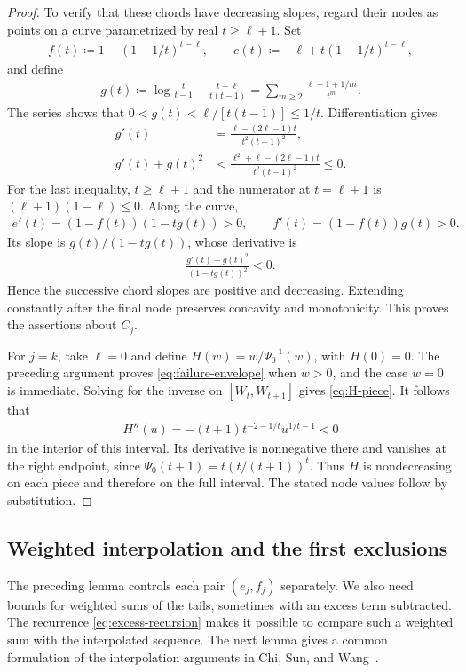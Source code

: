 \begin{proof}
To verify that these chords have decreasing slopes, regard their nodes as points on a curve parametrized by real $t\ge\ell+1$. Set
\begin{align*}
 f(t)\coloneqq1-(1-1/t)^{t-\ell},
 \qquad e(t)\coloneqq-\ell+t(1-1/t)^{t-\ell},
\end{align*}
and define
\begin{align*}
 g(t)\coloneqq\log\frac{t}{t-1}-\frac{t-\ell}{t(t-1)}
 =\sum_{m\ge2}\frac{\ell-1+1/m}{t^m}.
\end{align*}
The series shows that $0<g(t)<\ell/[t(t-1)]\le1/t$. Differentiation gives
\begin{align*}
 g'(t)&=\frac{\ell-(2\ell-1)t}{t^2(t-1)^2},\\
 g'(t)+g(t)^2
 &<\frac{\ell^2+\ell-(2\ell-1)t}{t^2(t-1)^2}\le0.
\end{align*}
For the last inequality, $t\ge\ell+1$ and the numerator at $t=\ell+1$ is $(\ell+1)(1-\ell)\le0$. Along the curve,
\begin{align*}
 e'(t)=(1-f(t))(1-tg(t))>0,
 \qquad f'(t)=(1-f(t))g(t)>0.
\end{align*}
Its slope is $g(t)/(1-tg(t))$, whose derivative is
\begin{align*}
 \frac{g'(t)+g(t)^2}{(1-tg(t))^2}<0.
\end{align*}
Hence the successive chord slopes are positive and decreasing. Extending constantly after the final node preserves concavity and monotonicity. This proves the assertions about $C_j$.

For $j=k$, take $\ell=0$ and define $H(w)=w/\Psi_0^{-1}(w)$, with $H(0)=0$. The preceding argument proves \cref{eq:failure-envelope} when $w>0$, and the case $w=0$ is immediate. Solving for the inverse on $[W_t,W_{t+1}]$ gives \cref{eq:H-piece}. It follows that
\begin{align*}
 H''(u)=-(t+1)t^{-2-1/t}u^{1/t-1}<0
\end{align*}
in the interior of this interval. Its derivative is nonnegative there and vanishes at the right endpoint, since $\Psi_0(t+1)=t(t/(t+1))^t$. Thus $H$ is nondecreasing on each piece and therefore on the full interval. The stated node values follow by substitution.
\end{proof}

\subsection{Weighted interpolation and the first exclusions}

The preceding lemma controls each pair $(e_j,f_j)$ separately. We also need bounds for weighted sums of the tails, sometimes with an excess term subtracted. The recurrence \cref{eq:excess-recursion} makes it possible to compare such a weighted sum with the interpolated sequence. The next lemma gives a common formulation of the interpolation arguments in Chi, Sun, and Wang~\cite[Lemmas 3.6 and 4.5]{CSW2026}.

